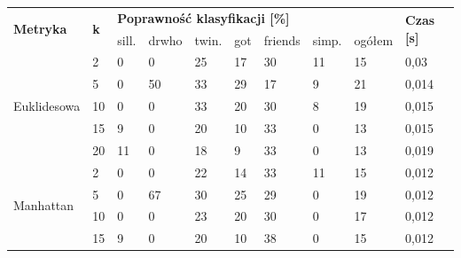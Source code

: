 \documentclass{classrep}
\begin{document}
\begin{table}[!ht]
    \centering
    \begin{tabular}{|l||l|l|l|l|l|l|l|l|l|}
    \hline
    \multirow{2}{*}{\textbf{Metryka}} & \multirow{2}{*}{\textbf{k}} & \multicolumn{7}{l|}{\textbf{Poprawność klasyfikacji [\%]}}         & \multirow{2}{*}{\textbf{Czas [s]}} \\ \cline{3-9}
                                      &                             & sill. & drwho & twin. & got & friends & simp. & ogółem &                                        \\ \hline
    \multirow{5}{*}{Euklidesowa}      & 2                           & 0              & 0     & 25        & 17  & 30      & 11       & 15     & 0,03                                   \\ \cline{2-10} 
                                      & 5                           & 0              & 50    & 33        & 29  & 17      & 9        & 21     & 0,014                                  \\ \cline{2-10} 
                                      & 10                          & 0              & 0     & 33        & 20  & 30      & 8        & 19     & 0,015                                  \\ \cline{2-10} 
                                      & 15                          & 9              & 0     & 20        & 10  & 33      & 0        & 13     & 0,015                                  \\ \cline{2-10} 
                                      & 20                          & 11             & 0     & 18        & 9   & 33      & 0        & 13     & 0,019                                  \\ \hline
    \multirow{5}{*}{Manhattan}        & 2                           & 0              & 0     & 22        & 14  & 33      & 11       & 15     & 0,012                                  \\ \cline{2-10} 
                                      & 5                           & 0              & 67    & 30        & 25  & 29      & 0        & 19     & 0,012                                  \\ \cline{2-10} 
                                      & 10                          & 0              & 0     & 23        & 20  & 30      & 0        & 17     & 0,012                                  \\ \cline{2-10} 
                                      & 15                          & 9              & 0     & 20        & 10  & 38      & 0        & 15     & 0,012                                  \\ \cline{2-10} 

\end{tabular}
\end{table}
\end{document}
